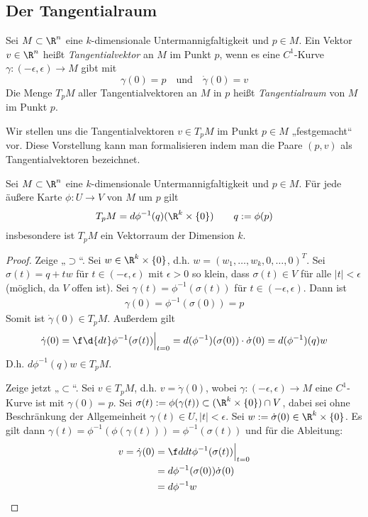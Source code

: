 \documentclass[a4paper,10pt]{scrartcl}
\begin{document}
\subsection{Der Tangentialraum}

\begin{df*}		
	Sei $M\subset \R^n$ eine $k$-dimensionale Untermannigfaltigkeit und $p\in M$.
	Ein Vektor $v\in \R^n$ heißt \emph{Tangentialvektor} an $M$ im Punkt $p$, wenn es eine $C^1$-Kurve $\gamma: (-\epsilon, \epsilon) \to M$ gibt mit
	\[
		\gamma(0) = p \quad \text{und} \quad \dot\gamma(0) = v
	\]
	Die Menge $T_pM$ aller Tangentialvektoren an $M$ in $p$ heißt \emph{Tangentialraum} von $M$ im Punkt $p$.
\end{df*}

\begin{note}
	Wir stellen uns die Tangentialvektoren $v\in T_pM$ im Punkt $p\in M$ „festgemacht“ vor.
	Diese Vorstellung kann man formalisieren indem man die Paare $(p,v)$ als Tangentialvektoren bezeichnet.
\end{note}

\begin{st}
	\label{14.10}
	Sei $M\subset\R^n$ eine $k$-dimensionale Untermannigfaltigkeit und $p\in M$.
	Für jede äußere Karte $\phi: U\to V$ von $M$ um $p$ gilt
	\[
		T_pM = d\phi^{-1}(q)(\R^k\times\{0\}) \qquad q := \phi(p)
	\]
	insbesondere ist $T_pM$ ein Vektorraum der Dimension $k$.
	\begin{proof}
		Zeige „$\supset$“.
		Sei $w\in \R^k\times\{0\}$, d.h. $w=(w_1,\dotsc, w_k, 0,\dotsc, 0)^T$.
		Sei $\sigma(t) = q+tw$ für $t\in (-\epsilon, \epsilon)$ mit $\epsilon > 0$ so klein, dass $\sigma(t) \in V$ für alle $|t| < \epsilon$ (möglich, da $V$ offen ist).
		Sei $\gamma(t) = \phi^{-1}(\sigma(t))$ für $t\in (-\epsilon,\epsilon)$.
		Dann ist
		\begin{align*}
			\gamma(0) = \phi^{-1}(\sigma(0)) = p
		\end{align*}
		Somit ist $\dot\gamma(0) \in T_pM$.
		Außerdem gilt
		\begin{align*}
			\dot\gamma(0) = \f\d{dt}\phi^{-1}(\sigma(t))\Big|_{t=0} = d(\phi^{-1})(\sigma(0))\cdot \dot \sigma(0) = d(\phi^{-1})(q)w
		\end{align*}
		D.h. $d\phi^{-1}(q)w\in T_pM$.

		Zeige jetzt „$\subset$“.
		Sei $v\in T_pM$, d.h. $v=\dot \gamma (0)$, wobei $\gamma : (-\epsilon,\epsilon)\to M$ eine $C^1$-Kurve ist mit $\gamma(0) = p$.
		Sei $\sigma(t) := \phi(\gamma(t)) \subset (\R^k\times\{0\})\cap V$, dabei sei ohne Beschränkung der Allgemeinheit $\gamma(t)\in U, |t|<\epsilon$.
		Sei $w:= \dot \sigma(0) \in \R^k\times\{0\}$.
		Es gilt dann $\gamma(t) = \phi^{-1}(\phi(\gamma(t))) = \phi^{-1}(\sigma(t))$ und für die Ableitung:
		\begin{align*}
			v = \dot\gamma(0) &= \f d{dt}\phi^{-1}(\sigma(t))\Big|_{t=0}\\
																		   &= d\phi^{-1}(\sigma(0))\dot\sigma(0)\\
															   &= d\phi^{-1}w
		\end{align*}
	\end{proof}
\end{st}
\end{document}
